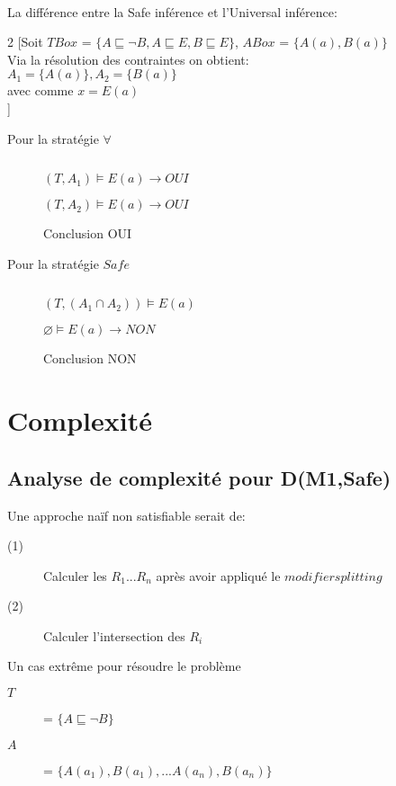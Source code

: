 \pagebreak
\ \\La différence entre la Safe inférence et l'Universal inférence:\\
\begin{multicols}{2}
[Soit $TBox$ = $\{ A \sqsubseteq \neg B, A \sqsubseteq E, B \sqsubseteq E \}$, $ABox$ = $\{A(a), B(a) \}$\\ 
Via la résolution des contraintes on obtient:\\ $A_1 = \{A(a) \}, A_2 = \{ B(a) \}$\\ avec comme $x = E(a)$\\]
\begin{description}
\item[Pour la stratégie $\forall$] $ $
\item[] $(T,A_1) \models E(a) \rightarrow OUI$
\item[] $(T,A_2) \models E(a) \rightarrow OUI$
\item[] Conclusion OUI
\end{description}
\begin{description}
\item[Pour la stratégie $Safe$] $ $
\item[] $(T,(A_1 \cap A_2)) \models E(a) $
\item[] $\varnothing  \models E(a) \rightarrow NON$
\item[] Conclusion NON
\end{description}
\end{multicols}

\chapter{Complexité}
\section{Analyse de complexité pour D(M1,Safe)}

Une approche naïf non satisfiable serait de:
\begin{description}
\item[(1)] Calculer les $R_1 ... R_n$ après avoir appliqué le $modifier splitting$
\item[(2)] Calculer l'intersection des $R_i$
\end{description}

Un cas extrême pour résoudre le problème
\begin{description}
\item[$T$] = $\{ A \sqsubseteq \neg B \}$
\item[$A$] = $\{ A(a_1), B(a_1), ... A(a_n), B(a_n) \}$
\end{description}

